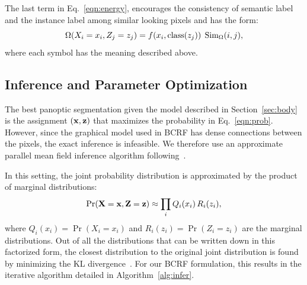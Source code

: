 The last term in Eq.~\eqref{eqn:energy}, encourages the consistency of semantic label and the instance label among similar looking pixels and has the form:
\begin{equation}
\Omega(X_i = x_i, Z_j = z_j) = f(x_i, \operatorname{class}(z_j))\; \operatorname{Sim_\Omega}(i, j),
\end{equation}
where each symbol has the meaning described above.


\subsection{Inference and Parameter Optimization}
\label{sec:infer}
The best panoptic segmentation given the model described in Section~\ref{sec:body} is the assignment $(\mathbf{x}, \mathbf{z})$ that maximizes the probability in Eq.~\eqref{eqn:prob}. However, since the graphical model used in BCRF has dense connections between the pixels, the exact inference is infeasible. We therefore use an approximate parallel mean field inference algorithm following~\cite{densecrf}.

In this setting, the joint probability distribution is approximated by the product of marginal distributions:
\begin{equation}
\label{eq:q_approx}
\Pr(\mathbf{X}=\mathbf{x}, \mathbf{Z}=\mathbf{z}) \approx \prod_i Q_i(x_i)\,R_i(z_i),
\end{equation}
where $Q_i(x_i) = \Pr(X_i = x_i)$ and $R_i(z_i) = \Pr(Z_i = z_i)$ are the marginal distributions. Out of all the distributions that can be written down in this factorized form, the closest distribution to the original joint distribution is found by minimizing the KL divergence~\cite{Koller_book, densecrf}. For our BCRF formulation, this results in the iterative algorithm detailed in Algorithm~\ref{alg:infer}.

